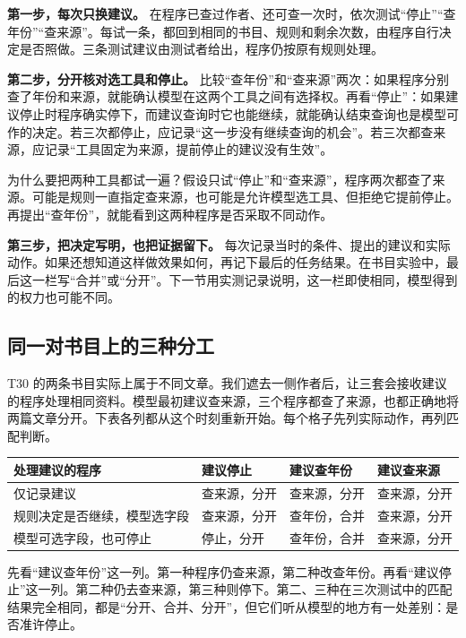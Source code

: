 \documentclass[UTF8,12pt,a4paper,fontset=none]{ctexart}
\begin{document}
\textbf{第一步，每次只换建议。} 在程序已查过作者、还可查一次时，依次测试“停止”“查年份”“查来源”。每试一条，都回到相同的书目、规则和剩余次数，由程序自行决定是否照做。三条测试建议由测试者给出，程序仍按原有规则处理。\par

\textbf{第二步，分开核对选工具和停止。} 比较“查年份”和“查来源”两次：如果程序分别查了年份和来源，就能确认模型在这两个工具之间有选择权。再看“停止”：如果建议停止时程序确实停下，而建议查询时它也能继续，就能确认结束查询也是模型可作的决定。若三次都停止，应记录“这一步没有继续查询的机会”。若三次都查来源，应记录“工具固定为来源，提前停止的建议没有生效”。\par

为什么要把两种工具都试一遍？假设只试“停止”和“查来源”，程序两次都查了来源。可能是规则一直指定查来源，也可能是允许模型选工具、但拒绝它提前停止。再提出“查年份”，就能看到这两种程序是否采取不同动作。\par

\textbf{第三步，把决定写明，也把证据留下。} 每次记录当时的条件、提出的建议和实际动作。如果还想知道这样做效果如何，再记下最后的任务结果。在书目实验中，最后这一栏写“合并”或“分开”。下一节用实测记录说明，这一栏即使相同，模型得到的权力也可能不同。\par

\subsection{同一对书目上的三种分工}

T30 的两条书目实际上属于不同文章。我们遮去一侧作者后，让三套会接收建议的程序处理相同资料。模型最初建议查来源，三个程序都查了来源，也都正确地将两篇文章分开。下表各列都从这个时刻重新开始。每个格子先列实际动作，再列匹配判断。\par

\begingroup\small\setlength{\tabcolsep}{3pt}\renewcommand{\arraystretch}{1.24}
\begin{longtable}{>{\raggedright\arraybackslash}p{0.33739\dimexpr\linewidth-8\tabcolsep\relax}>{\raggedright\arraybackslash}p{0.22087\dimexpr\linewidth-8\tabcolsep\relax}>{\raggedright\arraybackslash}p{0.22087\dimexpr\linewidth-8\tabcolsep\relax}>{\raggedright\arraybackslash}p{0.22087\dimexpr\linewidth-8\tabcolsep\relax}}
\toprule
\textbf{处理建议的程序} & \textbf{建议停止} & \textbf{建议查年份} & \textbf{建议查来源} \\
\midrule
\endhead
仅记录建议 & 查来源，分开 & 查来源，分开 & 查来源，分开 \\
规则决定是否继续，模型选字段 & 查来源，分开 & 查年份，合并 & 查来源，分开 \\
模型可选字段，也可停止 & 停止，分开 & 查年份，合并 & 查来源，分开 \\
\bottomrule
\end{longtable}\endgroup
先看“建议查年份”这一列。第一种程序仍查来源，第二种改查年份。再看“建议停止”这一列。第二种仍去查来源，第三种则停下。第二、三种在三次测试中的匹配结果完全相同，都是“分开、合并、分开”，但它们听从模型的地方有一处差别：是否准许停止。\par
\end{document}

